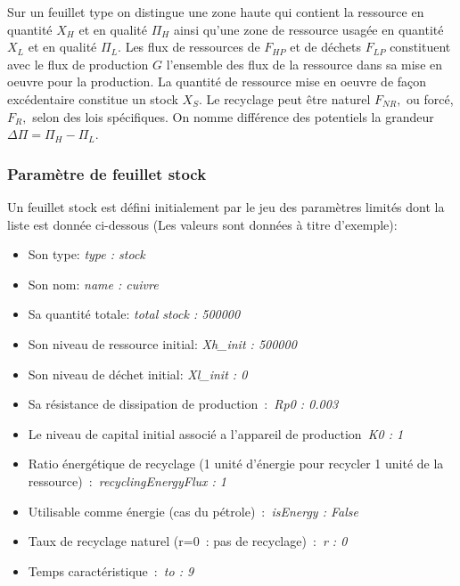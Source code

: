 \documentclass[12pt,a4paper]{article}%
\begin{document}
Sur un feuillet type on distingue une zone haute qui contient la ressource en
quantité $X_{H}$ et en qualité $\Pi_{H}$ ainsi qu'une zone de ressource usagée
en quantité $X_{L}$ et en qualité $\Pi_{L}$. Les flux de ressources de
$F_{HP}$ et de déchets $F_{LP}$ constituent avec le flux de production $G$
l'ensemble des flux de la ressource dans sa mise en oeuvre pour la production.
La quantité de ressource mise en oeuvre de façon excédentaire constitue un
stock $X_{S}$. Le recyclage peut être naturel $F_{NR},$ ou forcé, $F_{R},$
selon des lois spécifiques. On nomme différence des potentiels la grandeur
$\Delta\Pi=\Pi_{H}-\Pi_{L}$.

\subsubsection{Paramètre de feuillet stock}

Un feuillet stock est défini initialement par le jeu des paramètres
limités dont la liste est donnée ci-dessous (Les valeurs sont données à
titre d'exemple):

\begin{itemize}
\item Son type: \textit{type : stock}

\item Son nom: \textit{name : cuivre}

\item Sa quantité totale: \textit{total stock : 500000}

\item Son niveau de ressource initial: \textit{Xh\_init : 500000}

\item Son niveau de déchet initial: \textit{Xl\_init : 0}

\item Sa résistance de dissipation de production~:\textit{\ Rp0 : 0.003}

\item Le niveau de capital initial associé a l'appareil de
production\textit{\ K0 : 1}

\item Ratio énergétique de recyclage (1 unité d'énergie pour recycler 1 unité
de la ressource)~:\textit{\ recyclingEnergyFlux : 1}

\item Utilisable comme énergie (cas du pétrole)~:\textit{\ isEnergy : False}

\item Taux de recyclage naturel (r=0~: pas de recyclage)~:\textit{\ r : 0}

\item Temps caractéristique~:\textit{\ to : 9}
\end{itemize}
\end{document}
